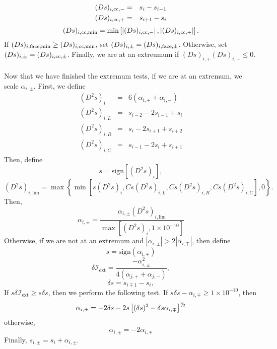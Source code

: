\begin{eqnarray}
(Ds)_{i,{\rm cc},-} &=& s_{i} - s_{i-1} \\
(Ds)_{i,{\rm cc},+} &=& s_{i+1} - s_{i}
\end{eqnarray}
\begin{equation}
(Ds)_{i,{\rm cc,min}} = \min\left[\left|(Ds)_{i,{\rm cc},-}\right|,\left|(Ds)_{i,{\rm cc},+}\right|\right].
\end{equation}
If $(Ds)_{i,{\rm face,min}} \ge (Ds)_{i,{\rm cc,min}}$, set 
$(Ds)_{i,\pm} = (Ds)_{i,{\rm face},\pm}$.  Otherwise, set 
$(Ds)_{i,\pm} = (Ds)_{i,{\rm cc},\pm}$.  Finally, we are at an extreumum if
$(Ds)_{i,+}(Ds)_{i,-} \le 0$.\\ \\

Now that we have finished the extremum tests, if we are at an extremum,
we scale $\alpha_{i,\pm}$.  First, we define
\begin{eqnarray}
(D^2s)_{i} &=& 6(\alpha_{i,+}+\alpha_{i,-}) \\
(D^2s)_{i,L} &=& s_{i-2}-2s_{i-1}+s_{i} \\
(D^2s)_{i,R} &=& s_{i}-2s_{i+1}+s_{i+2} \\
(D^2s)_{i,C} &=& s_{i-1}-2s_{i}+s_{i+1}
\end{eqnarray}
Then, define
\begin{equation}
s = \text{sign}\left[(D^2s)_{i}\right],
\end{equation}
\begin{equation}
(D^2s)_{i,\text{lim}} = \max\left\{\min\left[s(D^2s)_{i},Cs(D^2s)_{i,L},Cs(D^2s)_{i,R},Cs(D^2s)_{i,C}\right],0\right\}.
\end{equation}
Then,
\begin{equation}
\alpha_{i,\pm} = \frac{\alpha_{i,\pm}(D^2s)_{i,\text{lim}}}{\max\left[(D^2s)_{i},1\times 10^{-10}\right]}
\end{equation}
Otherwise, if we are not at an extremum and $|\alpha_{i,\pm}| > 2|\alpha_{i,\mp}|$,
then define
\begin{equation}
s = \text{sign}(\alpha_{i,\mp})
\end{equation}
\begin{equation}
\delta\mathcal{I}_{\text{ext}} = \frac{-\alpha_{i,\pm}^2}{4\left(\alpha_{j,+}+\alpha_{j,-}\right)},
\end{equation}
\begin{equation}
\delta s = s_{i\mp 1} - s_i,
\end{equation}
If $s\delta\mathcal{I}_{\text{ext}} \ge s\delta s$, then we perform the following test.
If $s\delta s - \alpha_{i,\mp} \ge 1\times 10^{-10}$, then
\begin{equation}
\alpha_{i,\pm} =  -2\delta s - 2s\left[(\delta s)^2 - \delta s \alpha_{i,\mp}\right]^{\myhalf}
\end{equation}
otherwise,
\begin{equation}
\alpha_{i,\pm} =  -2\alpha_{i,\mp}
\end{equation}
Finally, $s_{i,\pm} = s_i + \alpha_{i,\pm}$.

